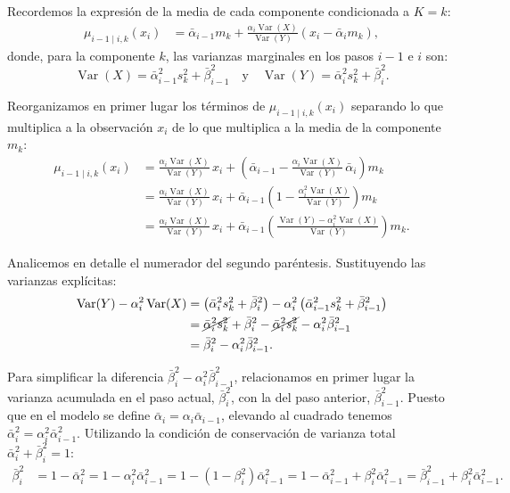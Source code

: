 \documentclass[11pt,a4paper]{article}
\DeclareMathOperator{\Var}{Var}
\begin{document}
Recordemos la expresión de la media de cada componente condicionada a $K = k$:
\begin{align*}
    \mu_{i-1\mid i, k}(x_i) &= \bar{\alpha}_{i-1} m_k + \frac{\alpha_i \Var(X)}{\Var(Y)}\left(x_i - \bar{\alpha}_i m_k\right),
\end{align*}
donde, para la componente $k$, las varianzas marginales en los pasos $i-1$ e $i$ son:
\[
\Var(X) = \bar{\alpha}_{i-1}^2 s_k^2 + \bar{\beta}_{i-1}^2 \quad \text{y} \quad \Var(Y) = \bar{\alpha}_i^2 s_k^2 + \bar{\beta}_i^2.
\]

Reorganizamos en primer lugar los términos de $\mu_{i-1\mid i, k}(x_i)$ separando lo que multiplica a la observación $x_i$ de lo que multiplica a la media de la componente $m_k$:
\begin{align*}
    \mu_{i-1\mid i, k}(x_i) &= \frac{\alpha_i \Var(X)}{\Var(Y)}\, x_i + \left(\bar{\alpha}_{i-1} - \frac{\alpha_i \Var(X)}{\Var(Y)}\, \bar{\alpha}_i\right) m_k \\
    &= \frac{\alpha_i \Var(X)}{\Var(Y)}\, x_i + \bar{\alpha}_{i-1} \left(1 - \frac{\alpha_i^2 \Var(X)}{\Var(Y)}\right) m_k \\
    &= \frac{\alpha_i \Var(X)}{\Var(Y)}\, x_i + \bar{\alpha}_{i-1} \left(\frac{\Var(Y) - \alpha_i^2 \Var(X)}{\Var(Y)}\right) m_k.
\end{align*}

Analicemos en detalle el numerador del segundo paréntesis. Sustituyendo las varianzas explícitas:
\begin{align*}
    \Var(Y) - \alpha_i^2 \Var(X) &= \left(\bar{\alpha}_i^2 s_k^2 + \bar{\beta}_i^2\right) - \alpha_i^2 \left(\bar{\alpha}_{i-1}^2 s_k^2 + \bar{\beta}_{i-1}^2\right) \\
    &= \cancel{\bar{\alpha}_i^2 s_k^2} + \bar{\beta}_i^2 - \cancel{\bar{\alpha}_i^2 s_k^2} - \alpha_i^2 \bar{\beta}_{i-1}^2 \\
    &= \bar{\beta}_i^2 - \alpha_i^2 \bar{\beta}_{i-1}^2.
\end{align*}

Para simplificar la diferencia $\bar{\beta}_i^2 - \alpha_i^2 \bar{\beta}_{i-1}^2$, relacionamos en primer lugar la varianza acumulada en el paso actual, $\bar{\beta}_i^2$, con la del paso anterior, $\bar{\beta}_{i-1}^2$. Puesto que en el modelo se define $\bar{\alpha}_i = \alpha_i \bar{\alpha}_{i-1}$, elevando al cuadrado tenemos $\bar{\alpha}_i^2 = \alpha_i^2 \bar{\alpha}_{i-1}^2$. Utilizando la condición de conservación de varianza total $\bar{\alpha}_i^2 + \bar{\beta}_i^2 = 1$:
\begin{align*}
    \bar{\beta}_i^2 &= 1 - \bar{\alpha}_i^2
    = 1 - \alpha_i^2 \bar{\alpha}_{i-1}^2
    = 1 - (1 - \beta_i^2)\bar{\alpha}_{i-1}^2
    = 1 - \bar{\alpha}_{i-1}^2 + \beta_i^2 \bar{\alpha}_{i-1}^2
    = \bar{\beta}_{i-1}^2 + \beta_i^2 \bar{\alpha}_{i-1}^2.
\end{align*}
\end{document}

